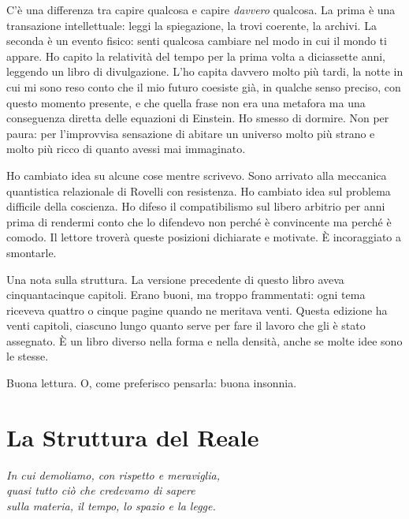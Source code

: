 \documentclass[11.5pt,a4paper,openany]{book}
\theoremstyle{remark}
\begin{document}
C'è una differenza tra capire qualcosa e capire \textit{davvero} qualcosa. La prima è una transazione intellettuale: leggi la spiegazione, la trovi coerente, la archivi. La seconda è un evento fisico: senti qualcosa cambiare nel modo in cui il mondo ti appare. Ho capito la relatività del tempo per la prima volta a diciassette anni, leggendo un libro di divulgazione. L'ho capita davvero molto più tardi, la notte in cui mi sono reso conto che il mio futuro coesiste già, in qualche senso preciso, con questo momento presente, e che quella frase non era una metafora ma una conseguenza diretta delle equazioni di Einstein. Ho smesso di dormire. Non per paura: per l'improvvisa sensazione di abitare un universo molto più strano e molto più ricco di quanto avessi mai immaginato.

Ho cambiato idea su alcune cose mentre scrivevo. Sono arrivato alla meccanica quantistica relazionale di Rovelli con resistenza. Ho cambiato idea sul problema difficile della coscienza. Ho difeso il compatibilismo sul libero arbitrio per anni prima di rendermi conto che lo difendevo non perché è convincente ma perché è comodo. Il lettore troverà queste posizioni dichiarate e motivate. È incoraggiato a smontarle.

Una nota sulla struttura. La versione precedente di questo libro aveva cinquantacinque capitoli. Erano buoni, ma troppo frammentati: ogni tema riceveva quattro o cinque pagine quando ne meritava venti. Questa edizione ha venti capitoli, ciascuno lungo quanto serve per fare il lavoro che gli è stato assegnato. È un libro diverso nella forma e nella densità, anche se molte idee sono le stesse.

Buona lettura. O, come preferisco pensarla: buona insonnia.

\clearpage

\tableofcontents
\clearpage

\part{La Struttura del Reale}

\begin{center}\itshape
In cui demoliamo, con rispetto e meraviglia,\\
quasi tutto ciò che credevamo di sapere\\
sulla materia, il tempo, lo spazio e la legge.
\end{center}
\clearpage
\end{document}
